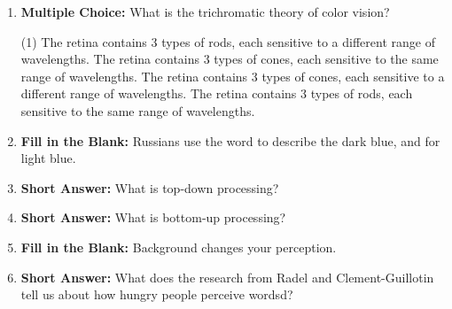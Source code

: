 \begin{enumerate}[label=\textbf{Q2.9.\arabic*}]
      \item \textbf{Multiple Choice:} What is the trichromatic theory of color vision?
            \begin{tasks}[label=\textcolor{draculafg}{(\Alph*)}, item-format=\color{draculafg}, label-width=1.5em, item-indent=1.7em](1)
                  \task The retina contains 3 types of rods, each sensitive to a different range of wavelengths.
                  \task The retina contains 3 types of cones, each sensitive to the same range of wavelengths.
                  \task The retina contains 3 types of cones, each sensitive to a different range of wavelengths.
                  \task The retina contains 3 types of rods, each sensitive to the same range of wavelengths.
            \end{tasks}

      \item \textbf{Fill in the Blank:} Russians use the word \underline{\hspace{3cm}} to describe the dark blue, and \underline{\hspace{3cm}} for light blue. \\
      

      \item \textbf{Short Answer:} What is top-down processing? \\

      \item \textbf{Short Answer:} What is bottom-up processing? \\

      \item \textbf{Fill in the Blank:} Background changes your \underline{\hspace{3cm}} perception. \\

      \item \textbf{Short Answer:} What does the research from Radel and Clement-Guillotin tell us about how hungry people perceive wordsd? \\

\end{enumerate}